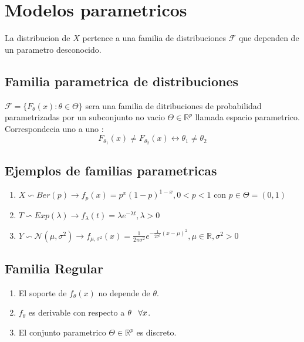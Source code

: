 \documentclass[titlepage,a4paper]{article}
\begin{document}
\section{Modelos parametricos}
La distribucion de $X$ pertence a una familia de distribuciones $\mathcal{F}$ que dependen de un parametro desconocido.\\
\subsection{Familia parametrica de distribuciones}
$\mathcal{F} = \{ F_{\theta}(x): \theta \in \Theta \}$ sera una familia de ditribuciones de probabilidad parametrizadas por un subconjunto
no vacio $\Theta \in \mathbb{R}^{p}$ llamada espacio parametrico.\\
Correspondecia uno a uno :
\begin{equation*}
    F_{\theta_{1}}(x) \neq F_{\theta_{2}}(x) \leftrightarrow \theta_{1} \neq \theta_{2}
\end{equation*}
\subsection{Ejemplos de familias parametricas}
\begin{enumerate}
    \item $X \backsim Ber(p) \rightarrow f_{p}(x) = p^{x}(1-p)^{1-x}, 0 < p < 1$ con $p \in \Theta = (0,1)$
    \item $T \backsim Exp(\lambda) \rightarrow f_{\lambda}(t) = \lambda e ^{-\lambda t}, \lambda > 0 $
    \item $Y \backsim \mathcal{N}(\mu, \sigma^{2}) \rightarrow f_{\mu,\sigma^{2}} (x) = \frac{1}{2 \pi \sigma^{2}} e^{-\frac{1}{2 \sigma ^{2}}(x-\mu)^{2}}, \mu \in \mathbb{R}, \sigma^{2} > 0  $
\end{enumerate}
\subsection{Familia Regular}
\begin{enumerate}
    \item El soporte de $f_{\theta}(x)$ no depende de $\theta$.
    \item $f_{\theta}$ es derivable con respecto a $\theta \hspace{8px} \forall x$.
    \item El conjunto parametrico $\Theta \in \mathbb{R}^{p}$ es discreto. 
\end{enumerate}
\end{document}
